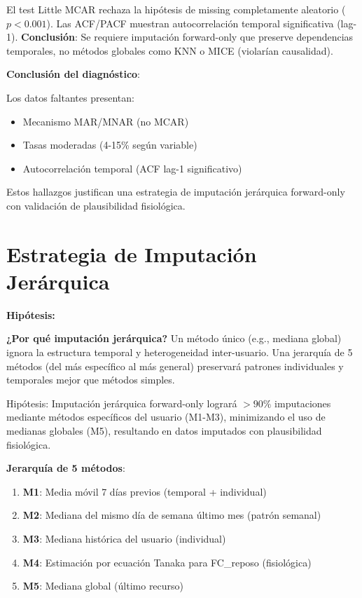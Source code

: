\documentclass[12pt,letterpaper,twoside]{report}
\begin{document}
\begin{calculobox}
\begin{decisionbox}
El test Little MCAR rechaza la hipótesis de missing completamente aleatorio ($p < 0.001$). Las ACF/PACF muestran autocorrelación temporal significativa (lag-1). \textbf{Conclusión}: Se requiere imputación forward-only que preserve dependencias temporales, no métodos globales como KNN o MICE (violarían causalidad).
\end{decisionbox}

\begin{conclusionbox}
\textbf{Conclusión del diagnóstico}:

Los datos faltantes presentan:
\begin{itemize}[noitemsep]
    \item Mecanismo MAR/MNAR (no MCAR)
    \item Tasas moderadas (4-15\% según variable)
    \item Autocorrelación temporal (ACF lag-1 significativo)
\end{itemize}

Estos hallazgos justifican una estrategia de imputación jerárquica forward-only con validación de plausibilidad fisiológica.
\end{conclusionbox}

\section{Estrategia de Imputación Jerárquica}

\begin{hipotesisbox}
\textbf{Hipótesis:}

\textbf{¿Por qué imputación jerárquica?} Un método único (e.g., mediana global) ignora la estructura temporal y heterogeneidad inter-usuario. Una jerarquía de 5 métodos (del más específico al más general) preservará patrones individuales y temporales mejor que métodos simples.

Hipótesis: Imputación jerárquica forward-only logrará $> 90\%$ imputaciones mediante métodos específicos del usuario (M1-M3), minimizando el uso de medianas globales (M5), resultando en datos imputados con plausibilidad fisiológica.
\end{hipotesisbox}

\begin{estadisticobox}
\textbf{Jerarquía de 5 métodos}:

\begin{enumerate}[noitemsep]
    \item \textbf{M1}: Media móvil 7 días previos (temporal + individual)
    \item \textbf{M2}: Mediana del mismo día de semana último mes (patrón semanal)
    \item \textbf{M3}: Mediana histórica del usuario (individual)
    \item \textbf{M4}: Estimación por ecuación Tanaka para FC\_reposo (fisiológica)
    \item \textbf{M5}: Mediana global (último recurso)
\end{enumerate}


\end{estadisticobox}
\end{calculobox}
\end{document}
